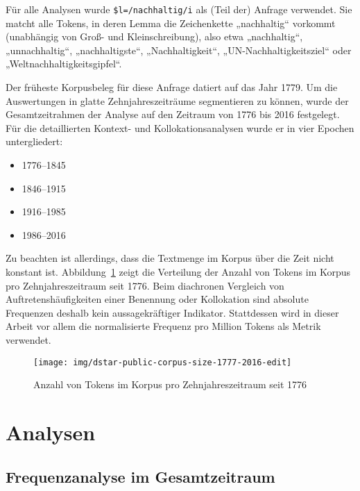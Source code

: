 \documentclass[
    german,
    a4paper,%
    12pt,%
    oneside,%
    toc=bibliography,
    final,
]{scrartcl}
\begin{document}
Für alle Analysen wurde \lstinline|$l=/nachhaltig/i| als (Teil der) Anfrage verwendet. Sie matcht alle Tokens, in deren Lemma die Zeichenkette „nachhaltig“ vorkommt (unabhängig von Groß- und Kleinschreibung), also etwa „nachhaltig“, „unnachhaltig“, „nachhaltigste“, „Nachhaltigkeit“, „UN-Nachhaltigkeitsziel“ oder „Weltnachhaltigkeitsgipfel“.

Der früheste Korpusbeleg für diese Anfrage datiert auf das Jahr 1779. Um die Auswertungen in glatte Zehnjahreszeiträume segmentieren zu können, wurde der Gesamtzeitrahmen der Analyse auf den Zeitraum von 1776 bis 2016 festgelegt. Für die detaillierten Kontext- und Kollokationsanalysen wurde er in vier Epochen untergliedert:

\begin{itemize}
\item 1776–1845
\item 1846–1915
\item 1916–1985
\item 1986–2016
\end{itemize}

Zu beachten ist allerdings, dass die Textmenge im Korpus über die Zeit nicht konstant ist. Abbildung~\ref{fig:corpus-size} zeigt die Verteilung der Anzahl von Tokens im Korpus pro Zehnjahreszeitraum seit 1776. Beim diachronen Vergleich von Auftretenshäufigkeiten einer Benennung oder Kollokation sind absolute Frequenzen deshalb kein aussagekräftiger Indikator. Stattdessen wird in dieser Arbeit vor allem die normalisierte Frequenz pro Million Tokens als Metrik verwendet.

\begin{figure}[h!]
\centering
\texttt{[image: img/dstar-public-corpus-size-1777-2016-edit]}
\caption[corpus-size]{Anzahl von Tokens im Korpus pro Zehnjahreszeitraum seit 1776\footnotemark}
\label{fig:corpus-size}
\end{figure}

\section{Analysen}
\label{sec:analysen}

\subsection{Frequenzanalyse im Gesamtzeitraum}
\label{subsec:freq-gesamt}
\end{document}
